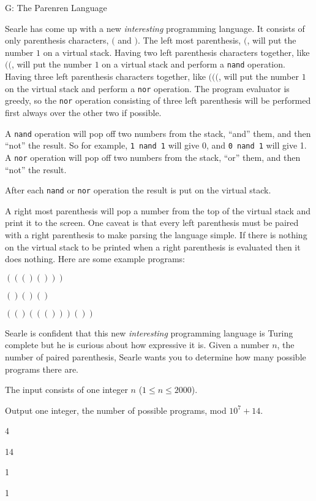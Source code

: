 \begin{problem}{G: The Parenren Language}

Searle has come up with a new \textit{interesting} programming language.
It consists of only parenthesis characters, $($ and $)$.
The left most parenthesis, $($, will put the number $1$ on a virtual stack.
Having two left parenthesis characters together, like $(($, will put the number $1$ on a virtual stack and perform a \texttt{nand} operation.
Having three left parenthesis characters together, like $((($, will put the number $1$ on the virtual stack and perform a \texttt{nor} operation.
The program evaluator is greedy, so the \texttt{nor} operation consisting of three left parenthesis will be performed first always over the other two if possible.

A \texttt{nand} operation will pop off two numbers from the stack, ``and'' them, and then ``not'' the result.
So for example, \texttt{1 nand 1} will give 0, and \texttt{0 nand 1} will give 1.
A \texttt{nor} operation will pop off two numbers from the stack, ``or'' them, and then ``not'' the result.

After each \texttt{nand} or \texttt{nor} operation the result is put on the virtual stack.

A right most parenthesis will pop a number from the top of the virtual stack and print it to the screen.
One caveat is that every left parenthesis must be paired with a right parenthesis to make parsing the language simple.
If there is nothing on the virtual stack to be printed when a right parenthesis is evaluated then it does nothing.
Here are some example programs:

$((()()))$

$()()()$

$(()((()))())$

Searle is confident that this new \textit{interesting} programming language is Turing complete but he is curious about how expressive it is.
Given a number $n$, the number of paired parenthesis, Searle wants you to determine how many possible programs there are.
\end{problem}

\begin{formalin}
The input consists of one integer $n$ ($1 \leq n \leq 2000$).
\end{formalin}

\begin{formalout}
Output one integer, the number of possible programs, mod $10^7 + 14$.
\end{formalout}

\begin{datain}
4
\end{datain}
\begin{dataout}
14
\end{dataout}

\begin{datain}
1
\end{datain}
\begin{dataout}
1
\end{dataout}
